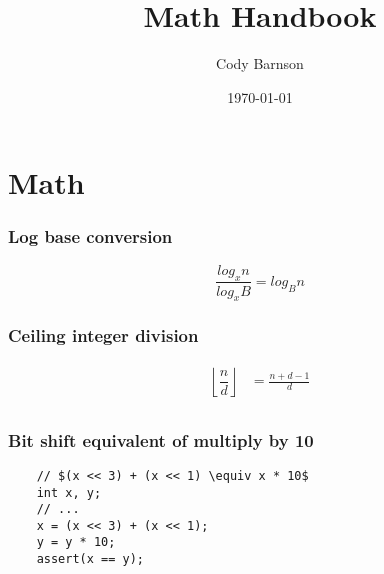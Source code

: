 \documentclass{article}
\begin{document}
\title{Math Handbook}
\author{Cody Barnson}
\date{\today}
\maketitle

\renewcommand\listoflistingscaption{Code segments}


\renewcommand\listingscaption{Code snippet}

{}




\section{Math}

\subsubsection{Log base conversion}
\begin{equation*}
\frac{log_xn}{log_xB} = log_Bn 
\end{equation*}

\subsubsection{Ceiling integer division}
\begin{align*}
    \left\lfloor\dfrac{n}{d}\right\rfloor &= \frac{n + d - 1}{d} \\
\end{align*}

\subsubsection{Bit shift equivalent of multiply by 10}
\begin{verbatim}
    // $(x << 3) + (x << 1) \equiv x * 10$
    int x, y;
    // ...
    x = (x << 3) + (x << 1);
    y = y * 10;
    assert(x == y);
\end{verbatim}
\end{document}

